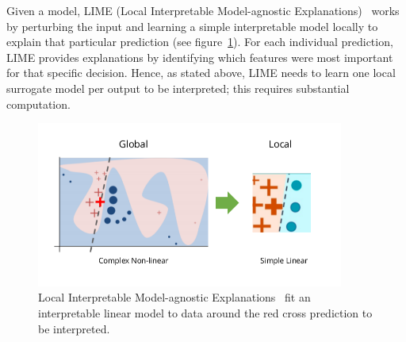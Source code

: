 Given a model, LIME (Local Interpretable Model-agnostic Explanations)~\cite{lime} works by perturbing the input and learning a simple interpretable model locally to explain that particular prediction (see figure~\ref{fig:lime}). For each individual prediction, LIME provides explanations by identifying which features were most important for that specific decision.
Hence, as stated above, LIME needs to learn one local surrogate model per output to be interpreted; this requires substantial computation.

\begin{figure}
    \includegraphics[width=0.9\textwidth]{images/lime.png}
    \caption{Local Interpretable Model-agnostic Explanations~\cite{lime} fit an interpretable linear model to data around the red cross prediction to be interpreted.}\label{fig:lime}
\end{figure}


